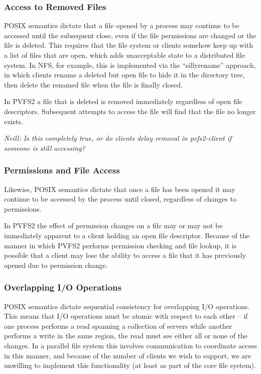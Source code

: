 \subsubsection{Access to Removed Files}

POSIX semantics dictate that a file opened by a process may continue to be
accessed until the subsequent close, even if the file permissions are changed
or the file is deleted.  This requires that the file system or clients somehow
keep up with a list of files that are open, which adds unacceptable state to a
distributed file system.  In NFS, for example, this is implemented via the
``sillyrename'' approach, in which clients rename a deleted but open file to
hide it in the directory tree, then delete the renamed file when the file is
finally closed.

In PVFS2 a file that is deleted is removed immediately regardless of open file
descriptors.  Subsequent attempts to access the file will find that the file
no longer exists.

\emph{ Neill: Is this completely true, or do clients delay removal in
  pvfs2-client if someone is still accessing? }

\subsubsection{Permissions and File Access}

Likewise, POSIX semantics dictate that once a file has been opened it may
continue to be accessed by the process until closed, regardless of changes to
permissions.

In PVFS2 the effect of permission changes on a file may or may not be
immediately apparent to a client holding an open file descriptor.  Because
of the manner in which PVFS2 performs permission checking and file lookup, it
is possible that a client may lose the ability to access a file that it has
previously opened due to permission change.

\subsubsection{Overlapping I/O Operations}

POSIX semantics dictate sequential consistency for overlapping I/O operations.
This means that I/O operations must be atomic with respect to each other -- if
one process performs a read spanning a collection of servers while another
performs a write in the same region, the read must see either all or none of
the changes.  In a parallel file system this involves communication to
coordinate access in this manner, and because of the number of clients we wish
to support, we are unwilling to implement this functionality (at least as part
of the core file system).

